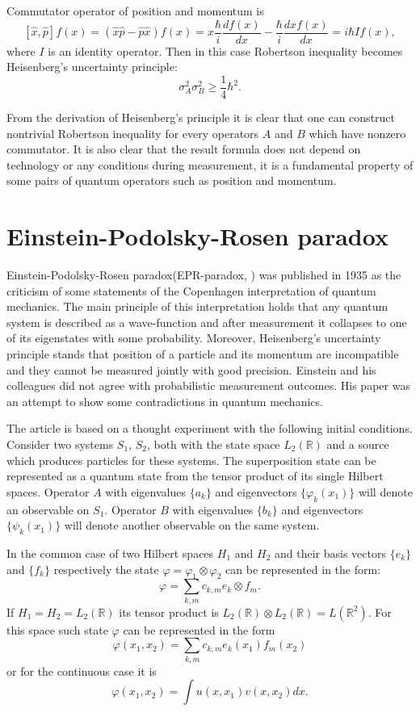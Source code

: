 \documentclass[11pt]{article}
\begin{document}
Commutator operator of position and momentum is 
\[
[\hat{x}, \hat{p}]f(x) = (\hat{x}\hat{p} - \hat{p}\hat{x})f(x) = x\frac{\hbar}{i}\frac{df(x)}{dx} - \frac{\hbar}{i}\frac{d xf(x)}{dx} = i\hbar If(x),
\]
where $I$ is an identity operator. Then in this case Robertson inequality becomes Heisenberg's uncertainty principle:
\[
\sigma_A^2\sigma_B^2 \geq \frac{1}{4}\hbar^2.
\]

From the derivation of Heisenberg's principle it is clear that one can construct nontrivial Robertson inequality for every operators $A$ and $B$ which have nonzero commutator. It is also clear that the result formula does not depend on technology or any conditions during measurement, it is a fundamental property of some pairs of quantum operators such as position and momentum.

\section{Einstein-Podolsky-Rosen paradox}
Einstein-Podolsky-Rosen paradox(EPR-paradox, \cite{EPR}) was published in 1935 as the criticism of some statements of the Copenhagen interpretation of quantum mechanics. The main principle of this interpretation holds that any quantum system is described as a wave-function and after measurement it collapses to one of its eigenstates with some probability. Moreover, Heisenberg's uncertainty principle stands that position of a particle and its momentum are incompatible and they cannot be measured jointly with good precision. Einstein and his colleagues did not agree with probabilistic measurement outcomes. His paper was an attempt to show some contradictions in quantum mechanics.

The article \cite{EPR} is based on a thought experiment with the following initial conditions. Consider two systems $S_1$, $S_2$, both with the state space $L_2(\mathbb{R})$ and a source which produces particles for these systems. The superposition state can be represented as a quantum state from the tensor product of its single Hilbert spaces.
Operator $A$ with eigenvalues $\{a_k\}$ and eigenvectors $\{\varphi_k(x_1)\}$ will denote an observable on $S_1$. Operator $B$  with eigenvalues $\{b_k\}$ and eigenvectors $\{\psi_k(x_1)\}$ will denote another observable on the same system. 

In the common case of two Hilbert spaces $H_1$ and $H_2$ and their basis vectors $\{e_k\}$ and $\{f_k\}$ respectively the state $\varphi = \varphi_1\otimes\varphi_2$ can be represented in the form:
\[
\varphi = \sum_{k, m}c_{k, m}e_k\otimes f_m.
\]
If $H_1 = H_2 = L_2(\mathbb{R})$ its tensor product is $L_2(\mathbb{R})\otimes L_2(\mathbb{R}) = L(\mathbb{R}^2)$. For this space such state $\varphi$ can be represented in the form
\[
\varphi (x_1, x_2) = \sum_{k, m}c_{k, m}e_k(x_1)f_m(x_2)
\]
or for the continuous case it is
\[
\varphi (x_1, x_2) = \int u(x, x_1)v(x, x_2)dx.
\]
\end{document}

